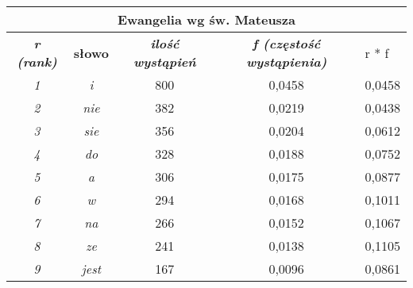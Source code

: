 \documentclass[a4paper]{article}
\begin{document}
\begin{table}
\begin{tabular}{ccc|c|l|}
\hline
\multicolumn{5}{|c|}{\textbf{Ewangelia wg św. Mateusza}}                                                                                                                         \\ \hline
\multicolumn{1}{|c|}{\textit{\textbf{r (rank)}}} & \multicolumn{1}{c|}{\textbf{słowo}} & \textit{\textbf{ilość wystąpień}} & \textit{\textbf{f (częstość wystąpienia)}} & r * f  \\ \hline
\multicolumn{1}{|c|}{\textit{1}}                 & \multicolumn{1}{c|}{\textit{i}}     & 800                               & 0,0458                                     & 0,0458 \\ \hline
\multicolumn{1}{|c|}{\textit{2}}                 & \multicolumn{1}{c|}{\textit{nie}}   & 382                               & 0,0219                                     & 0,0438 \\ \hline
\multicolumn{1}{|c|}{\textit{3}}                 & \multicolumn{1}{c|}{\textit{sie}}   & 356                               & 0,0204                                     & 0,0612 \\ \hline
\multicolumn{1}{|c|}{\textit{4}}                 & \multicolumn{1}{c|}{\textit{do}}    & 328                               & 0,0188                                     & 0,0752 \\ \hline
\multicolumn{1}{|c|}{\textit{5}}                 & \multicolumn{1}{c|}{\textit{a}}     & 306                               & 0,0175                                     & 0,0877 \\ \hline
\multicolumn{1}{|c|}{\textit{6}}                 & \multicolumn{1}{c|}{\textit{w}}     & 294                               & 0,0168                                     & 0,1011 \\ \hline
\multicolumn{1}{|c|}{\textit{7}}                 & \multicolumn{1}{c|}{\textit{na}}    & 266                               & 0,0152                                     & 0,1067 \\ \hline
\multicolumn{1}{|c|}{\textit{8}}                 & \multicolumn{1}{c|}{\textit{ze}}    & 241                               & 0,0138                                     & 0,1105 \\ \hline
\multicolumn{1}{|c|}{\textit{9}}                 & \multicolumn{1}{c|}{\textit{jest}}  & 167                               & 0,0096                                     & 0,0861 \\ \hline

\end{tabular}
\end{table}
\end{document}
